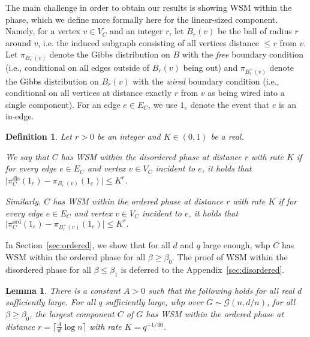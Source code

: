 \documentclass[11pt]{article}
\theoremstyle{plain}
\newtheorem{lemma}[theorem]{Lemma}
\newtheorem{definition}[theorem]{Definition}
\newcommand{\G}{\mathcal{G}}
\newcommand{\1}{\mathbb{1}}
\newcommand{\ord}{\mathrm{ord}}
\newcommand{\dis}{\mathrm{dis}}
\begin{document}
The main challenge in order to obtain our results is showing WSM within the phase, which we define more formally here for the linear-sized component. Namely, for a vertex \(v\in V_C\) and an integer \(r\), let \(B_r(v)\) be the ball of radius \(r\) around \(v\), i.e. the induced subgraph consisting of all vertices distance \(\leq r\) from \(v\).
Let \(\pi_{B_r^-(v)}\) denote the Gibbs distribution on \(B\) with the \textit{free} boundary condition (i.e., conditional on all edges outside of \(B_r(v)\) being out) and \(\pi_{B_r^+(v)}\) denote the Gibbs distribution on \(B_r(v)\) with the \textit{wired} boundary condition (i.e.,  conditional on all  vertices at distance exactly \(r\) from \(v\) as being wired into a single component). For an edge   \(e\in E_C\), we use \(1_e\) denote the event that \(e\) is an in-edge.
\begin{definition}\label{def:wsm}
    Let $r>0$ be an integer and $K\in (0,1)$ be a real. 
    
    We say that \(C\) has \emph{WSM within the disordered phase} at distance \(r\) with rate $K$  if for every edge \(e\in E_C\) and  vertex \(v\in V_C\) incident to \(e\),  it holds that $\big|\pi_C^\dis(1_e) - \pi_{B^{-}_r(v)}(1_e)\big|\leq K^r$.
    
    Similarly, \(C\) has \emph{WSM within the ordered phase} at distance \(r\) with rate $K$ if for every edge \(e\in E_C\) and vertex \(v\in V_C\) incident to \(e\), it holds that $\big|\pi_C^\ord(1_e) - \pi_{B^+_r(v)}(1_e)\big|\leq K^r.$
\end{definition}

In Section~\ref{sec:ordered}, we show that for all \(d\) and \(q\) large enough, whp \(C\) has WSM within the ordered phase for all \(\beta\geq \beta_0\). The proof of WSM within the disordered phase for all \(\beta\leq\beta_1\) is deferred to the Appendix~\ref{sec:disordered}. 

\begin{lemma}\label{lem:ordered-WSM}
    There is a constant $A>0$ such that the following holds for all real $d$ sufficiently large. For all $q$ sufficiently large,  whp over \(G\sim\G(n,d/n)\), for all $\beta\geq \beta_0$, the largest component $C$ of $G$ has WSM within the ordered phase at distance $r=\lceil\frac{A}{d} \log n\rceil$ with rate $K=q^{-1/30}$.
\end{lemma}
\end{document}

